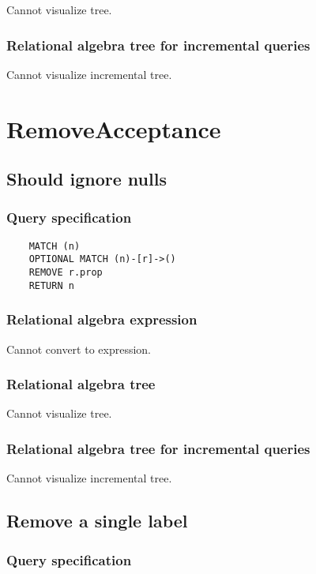	Cannot visualize tree.

	\subsubsection*{Relational algebra tree for incremental queries}

	Cannot visualize incremental tree.

	\section{RemoveAcceptance}

	\subsection{Should ignore nulls}

	\subsubsection*{Query specification}

	\begin{lstlisting}
	MATCH (n)
	OPTIONAL MATCH (n)-[r]->()
	REMOVE r.prop
	RETURN n
	\end{lstlisting}


	\subsubsection*{Relational algebra expression}

	Cannot convert to expression.

	\subsubsection*{Relational algebra tree}

	Cannot visualize tree.

	\subsubsection*{Relational algebra tree for incremental queries}

	Cannot visualize incremental tree.
	\subsection{Remove a single label}

	\subsubsection*{Query specification}

